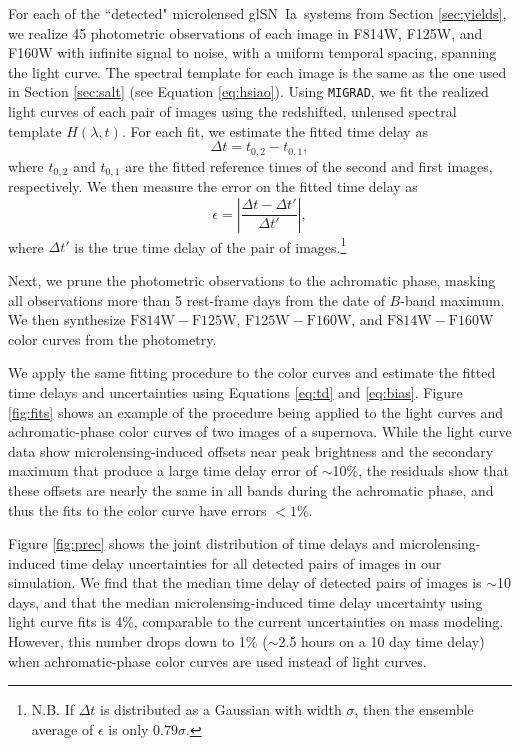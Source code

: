 \documentclass[iop,apj,numberedappendix,twocolappendix]{emulateapj}
\newcommand{\snia}{{\rm SN~Ia}}
\newcommand{\dt}{\ensuremath{\Delta t}}
\begin{document}
For each  of  the ``detected" microlensed gl\snia\ systems from Section \ref{sec:yields}, we realize 45 photometric observations of each image in F814W, F125W, and F160W with infinite signal to noise, with a uniform temporal spacing, spanning the light curve.
The spectral template for each image is the same as  the one used in Section \ref{sec:salt} (see Equation \ref{eq:hsiao}).
Using \texttt{MIGRAD}, we fit the realized light curves of each pair of images using the redshifted, unlensed spectral template $H(\lambda, t)$. 
For each fit, we estimate the fitted time delay as
\begin{equation}
\label{eq:td}
\dt = t_{0,2} - t_{0,1},
\end{equation}
where $t_{0,2}$ and $t_{0,1}$ are the fitted reference times of the second and first images, respectively.
We then measure the error on the fitted time delay as
\begin{equation}
	\label{eq:bias}
	\epsilon = \left|\frac{\Delta t - \Delta t'}{\Delta t'}\right|,
\end{equation}
where $\Delta t'$ is the true time delay of the pair of images.\footnote{N.B. If $\Delta t$ is distributed as a Gaussian with width $\sigma$, then the ensemble average of $\epsilon$ is only $0.79\sigma$.}

Next, we prune the photometric observations to the achromatic phase, masking all observations more than 5 rest-frame days from the date of $B$-band maximum. 
We then synthesize $\mathrm{F814W} - \mathrm{F125W}$, $\mathrm{F125W} - \mathrm{F160W}$, and $\mathrm{F814W} - \mathrm{F160W}$ color curves from the photometry.

We  apply the same fitting procedure to the color curves and estimate the fitted time delays and uncertainties using Equations \ref{eq:td} and \ref{eq:bias}.
Figure \ref{fig:fits} shows an example of the procedure being applied to the light curves and achromatic-phase color curves of two images of a supernova. 
While the light curve data show microlensing-induced offsets near peak brightness and the secondary maximum that produce a large time delay error of $\sim$10\%, the residuals show that these offsets are nearly the same in all bands during the achromatic phase, and thus the fits to the color curve have errors $<1$\%.

Figure \ref{fig:prec} shows the joint distribution of time delays and microlensing-induced time delay uncertainties for all detected pairs of images in our simulation.
We find that the median time delay of detected pairs of images is $\sim$10 days, and that the median microlensing-induced time delay uncertainty using light curve fits is 4\%, comparable to the current uncertainties on mass modeling.
However, this number drops down to 1\% ($\sim$2.5 hours on a 10 day time delay) when achromatic-phase color curves are used instead of light curves.
\end{document}
